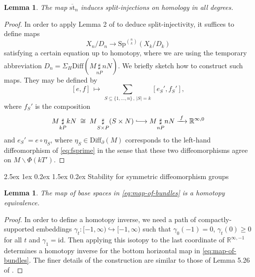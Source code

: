 \documentclass[reqno,a4paper]{article}
\makeatletter
\numberwithin{equation}{section}
\theoremstyle{italicised}
\newtheorem{lem}[thm]{Lemma}
\theoremstyle{upright}
\theoremstyle{italicised-restate}
\renewcommand*{\subsection}{\@startsection{subsection}{2}{\z@}%
	{2.5ex \@plus 1ex \@minus 0.2ex}%
	{1.5ex \@plus 0.2ex}%
	{\normalfont\normalsize\bfseries}}
\newcommand{\lhto}{\lhook\joinrel\longrightarrow}
\newcommand{\bR}{\mathbb{R}}
\renewcommand{\geq}{\geqslant}
\newcommand{\rinftyz}{\ensuremath{\bR^{\infty,0}}}
\newcommand{\rinftym}{\ensuremath{\bR^{\infty,-1}}}
\makeatother
\begin{document}
\begin{lem}\label{l:split-injectivity}
The map $\overline{\mathrm{st}}_n$ induces split-injections on homology in all degrees.
\end{lem}
\begin{proof}
In order to apply Lemma 2 of \cite{Dold1962DecompositiontheoremsSn} to deduce split-injectivity, it suffices to define maps
\[
X_n/D_n \longrightarrow \mathrm{Sp}^{\binom{n}{k}} (X_k / D_k)
\]
satisfying a certain equation up to homotopy, where we are using the temporary abbreviation $D_n = \Sigma_H \mathrm{Diff}(M \underset{nP}{\sharp} nN)$. We briefly sketch how to construct such maps. They may be defined by
\[
[e,f] \,\longmapsto\, \sum_{S \subseteq \{1,\ldots,n\} \, , \, \lvert S \rvert = k} [e_S',f_S'],
\]
where $f_S'$ is the composition
\begin{equation}\label{eq:fsprime}
M \underset{kP}{\sharp} kN \;\cong\; M \underset{S \times P}{\sharp} (S \times N) \lhto M \underset{nP}{\sharp} nN \xrightarrow{\; f \;} \rinftyz
\end{equation}
and $e_S' = e \circ \eta_S$, where $\eta_S \in \mathrm{Diff}_\partial(M)$ corresponds to the left-hand diffeomorphism of \eqref{eq:fsprime} in the sense that these two diffeomorphisms agree on $M \smallsetminus \Phi(kT')$.
\end{proof}


\subsection{Stability for symmetric diffeomorphism groups}


\begin{lem}
The map of base spaces in \eqref{eq:map-of-bundles} is a homotopy equivalence.
\end{lem}
\begin{proof}
In order to define a homotopy inverse, we need a path of compactly-supported embeddings $\gamma_t \colon [-1,\infty) \hookrightarrow [-1,\infty)$ such that $\gamma_0(-1) = 0$, $\gamma_t(0) \geq 0$ for all $t$ and $\gamma_1 = \mathrm{id}$. Then applying this isotopy to the last coordinate of $\rinftym$ determines a homotopy inverse for the bottom horizontal map in \eqref{eq:map-of-bundles}. The finer details of the construction are similar to those of Lemma 5.26 of \cite{Palmer2018HomologicalstabilitymoduliI}.
\end{proof}
\end{document}
